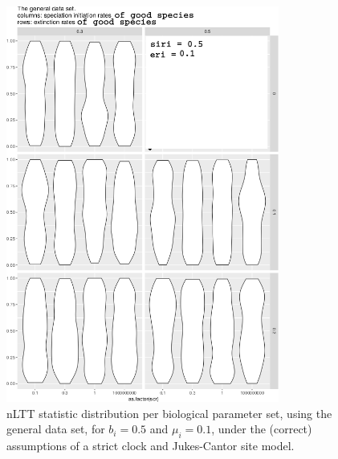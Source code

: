 \documentclass{article}
\begin{document}
\begin{figure}[!htbp]
  \includegraphics[width=0.8\textwidth]{fig_general_5.png}
  \caption{
    nLTT statistic distribution per biological parameter set, using the
    general data set, 
    for $b_i = 0.5$ and $\mu_i = 0.1$, 
    under the (correct) assumptions of a strict clock and Jukes-Cantor site model.
  }
\end{figure}
\end{document}
